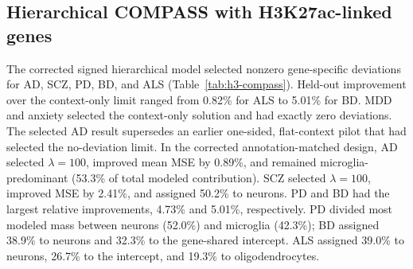 \documentclass[11pt]{article}
\begin{document}
\subsection{Hierarchical COMPASS with H3K27ac-linked genes}

The corrected signed hierarchical model selected nonzero gene-specific deviations for AD, SCZ, PD, BD, and ALS (Table~\ref{tab:h3-compass}). Held-out improvement over the context-only limit ranged from 0.82\% for ALS to 5.01\% for BD. MDD and anxiety selected the context-only solution and had exactly zero deviations. The selected AD result supersedes an earlier one-sided, flat-context pilot that had selected the no-deviation limit. In the corrected annotation-matched design, AD selected $\lambda=100$, improved mean MSE by 0.89\%, and remained microglia-predominant (53.3\% of total modeled contribution). SCZ selected $\lambda=100$, improved MSE by 2.41\%, and assigned 50.2\% to neurons. PD and BD had the largest relative improvements, 4.73\% and 5.01\%, respectively. PD divided most modeled mass between neurons (52.0\%) and microglia (42.3\%); BD assigned 38.9\% to neurons and 32.3\% to the gene-shared intercept. ALS assigned 39.0\% to neurons, 26.7\% to the intercept, and 19.3\% to oligodendrocytes.

\begin{table}[ht]
\centering
\scriptsize
\caption{Corrected signed hierarchical COMPASS results for H3K27ac peak-to-expressed-gene annotations. MSE$_0$ is the context-only limit. Fractions include the gene-shared intercept (I).}
\label{tab:h3-compass}
\end{table}
\end{document}
